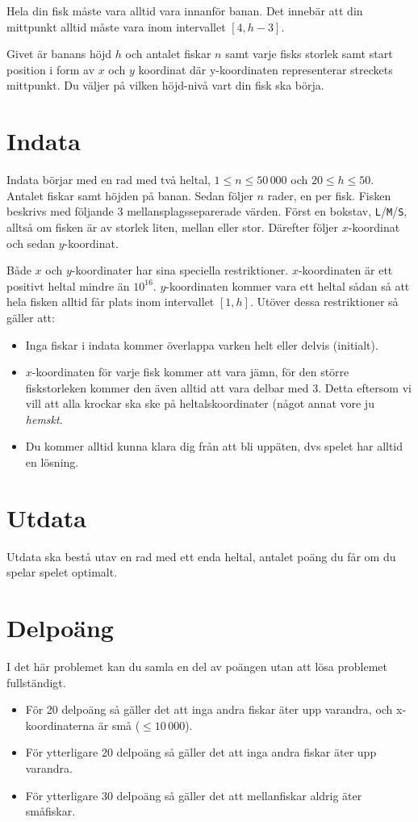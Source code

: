 Hela din fisk måste vara alltid vara innanför banan. Det innebär att
din mittpunkt alltid måste vara inom intervallet $[4, h-3]$.

Givet är banans höjd $h$ och antalet fiskar $n$ samt
varje fisks storlek samt start position i form av $x$ och $y$ koordinat där y-koordinaten
representerar streckets mittpunkt. Du väljer på vilken höjd-nivå vart din fisk ska börja.

\section*{Indata}

Indata börjar med en rad med två heltal, $1 \leq n \leq 50\,000$ och $20 \leq
h \leq 50$. Antalet fiskar samt höjden på banan. Sedan följer $n$ rader,
en per fisk. Fisken beskrivs med följande 3 mellansplagsseparerade värden.
Först en bokstav, \texttt{L}/\texttt{M}/\texttt{S}, alltså om fisken är av
storlek liten, mellan eller stor. Därefter följer $x$-koordinat och sedan
$y$-koordinat.

Både $x$ och $y$-koordinater har sina speciella restriktioner. $x$-koordinaten
är ett positivt heltal mindre än $10^{16}$. $y$-koordinaten kommer vara ett
heltal sådan så att hela fisken alltid får plats inom intervallet $[1, h]$.
Utöver dessa restriktioner så gäller att:

\begin{itemize}
  \item
    Inga fiskar i indata kommer överlappa varken helt eller delvis (initialt).
  \item
      $x$-koordinaten för varje fisk kommer att vara jämn, för den större
      fiskstorleken kommer den även alltid att vara delbar med 3. Detta
      eftersom vi vill att alla krockar ska ske på heltalskoordinater (något
      annat vore ju \emph{hemskt}.
  \item
    Du kommer alltid kunna klara dig från att bli uppäten, dvs spelet har
    alltid en lösning.
\end{itemize}

\section*{Utdata}
Utdata ska bestå utav en rad med ett enda heltal, antalet poäng du får om du spelar spelet optimalt.

\section*{Delpoäng}
I det här problemet kan du samla en del av poängen utan att lösa problemet fullständigt.

\begin{itemize}
    \item För 20 delpoäng så gäller det att inga andra fiskar äter upp
          varandra, och x-koordinaterna är små ($\leq 10\,000$).
    \item För ytterligare 20 delpoäng så gäller det att inga andra fiskar
          äter upp varandra.
    \item För ytterligare 30 delpoäng så gäller det att mellanfiskar aldrig
          äter småfiskar.
\end{itemize}
